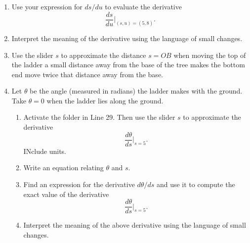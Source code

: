 \documentclass{ximera}
\begin{document}
\begin{question}
\begin{enumerate}
\item Use your expression for $ds/du$ to evaluate the derivative
\[
\frac{ds}{du}\Big|_{(s,u) = (5,8)} .
\]

\item Interpret the meaning of the derivative using the language of small changes.

\item Use the slider $s$ to approximate the distance $s=OB$ when moving the top of the ladder a small distance away from the base of the tree makes the bottom end move twice that distance away from the base.

\item Let $\theta$ be the angle (measured in radians) the ladder makes with the ground. Take $\theta=0$ when the ladder lies along the ground.

\begin{enumerate}
\item Activate the folder in Line 29. Then use the slider $s$ to approximate the derivative 
\[
\frac{d\theta}{ds}\Big|_{s=5} .
\]
INclude units.

\item Write an equation relating $\theta$ and $s$.

\item Find an expression for the derivative $d\theta/ds$ and use it to compute the exact value of the derivative
\[
\frac{d\theta}{ds}\Big|_{s=5} .
\]

\item Interpret the meaning of the above derivative using the language of small changes.

\end{enumerate}



\end{enumerate}

\end{question}
\end{document}
